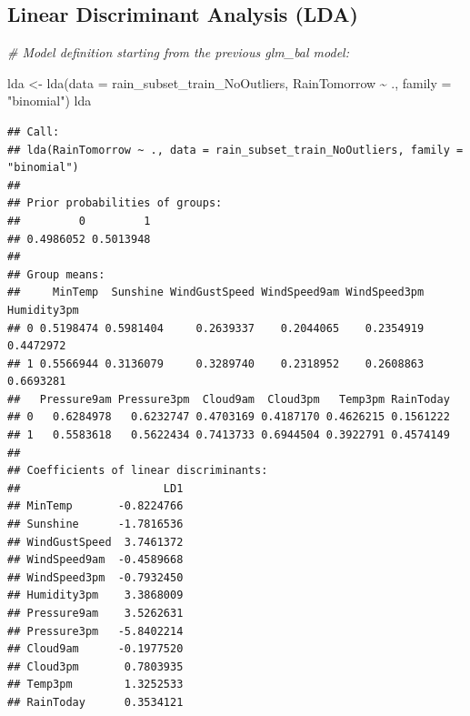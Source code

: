 \documentclass[
]{article}
\newenvironment{Shaded}{\begin{snugshade}}{\end{snugshade}}
\newcommand{\AttributeTok}[1]{\textcolor[rgb]{0.77,0.63,0.00}{#1}}
\newcommand{\CommentTok}[1]{\textcolor[rgb]{0.56,0.35,0.01}{\textit{#1}}}
\newcommand{\FunctionTok}[1]{\textcolor[rgb]{0.00,0.00,0.00}{#1}}
\newcommand{\NormalTok}[1]{#1}
\newcommand{\OtherTok}[1]{\textcolor[rgb]{0.56,0.35,0.01}{#1}}
\newcommand{\SpecialCharTok}[1]{\textcolor[rgb]{0.00,0.00,0.00}{#1}}
\newcommand{\StringTok}[1]{\textcolor[rgb]{0.31,0.60,0.02}{#1}}
\begin{document}
\hypertarget{linear-discriminant-analysis-lda}{%
\subsection{Linear Discriminant Analysis
(LDA)}\label{linear-discriminant-analysis-lda}}

\begin{Shaded}
\begin{Highlighting}[]
\CommentTok{\# Model definition starting from the previous glm\_bal model:}

\NormalTok{lda }\OtherTok{\textless{}{-}}
  \FunctionTok{lda}\NormalTok{(}\AttributeTok{data =}\NormalTok{ rain\_subset\_train\_NoOutliers, RainTomorrow }\SpecialCharTok{\textasciitilde{}}\NormalTok{ ., }\AttributeTok{family =} \StringTok{"binomial"}\NormalTok{)}
\NormalTok{lda}
\end{Highlighting}
\end{Shaded}

\begin{verbatim}
## Call:
## lda(RainTomorrow ~ ., data = rain_subset_train_NoOutliers, family = "binomial")
## 
## Prior probabilities of groups:
##         0         1 
## 0.4986052 0.5013948 
## 
## Group means:
##     MinTemp  Sunshine WindGustSpeed WindSpeed9am WindSpeed3pm Humidity3pm
## 0 0.5198474 0.5981404     0.2639337    0.2044065    0.2354919   0.4472972
## 1 0.5566944 0.3136079     0.3289740    0.2318952    0.2608863   0.6693281
##   Pressure9am Pressure3pm  Cloud9am  Cloud3pm   Temp3pm RainToday
## 0   0.6284978   0.6232747 0.4703169 0.4187170 0.4626215 0.1561222
## 1   0.5583618   0.5622434 0.7413733 0.6944504 0.3922791 0.4574149
## 
## Coefficients of linear discriminants:
##                      LD1
## MinTemp       -0.8224766
## Sunshine      -1.7816536
## WindGustSpeed  3.7461372
## WindSpeed9am  -0.4589668
## WindSpeed3pm  -0.7932450
## Humidity3pm    3.3868009
## Pressure9am    3.5262631
## Pressure3pm   -5.8402214
## Cloud9am      -0.1977520
## Cloud3pm       0.7803935
## Temp3pm        1.3252533
## RainToday      0.3534121
\end{verbatim}
\end{document}
